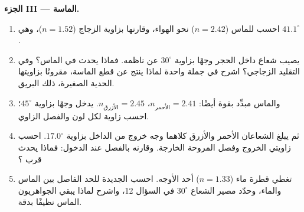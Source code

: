 \begin{problem}
\medskip
\noindent\textbf{الجزء III --- الماسة.}
\begin{enumerate}[resume]
  \item احسب  للماس ($n = 2.42$) نحو الهواء،
        وقارنها بزاوية الزجاج ($n = 1.52$)،
        وهي $41.1^\circ$.
  \item يصيب شعاع داخل الحجر وجهًا بزاوية $30^\circ$ عن
        ناظمه. فماذا يحدث في الماس؟ وفي التقليد الزجاجي؟
        اشرح في جملة واحدة لماذا ينتج عن قطع الماسة، مقرونًا
        بزاويتها الحدية الصغيرة، ذلك البريق.
  \item والماس مبدِّد بقوة أيضًا: $n_{\text{الأحمر}} = 2.41$،
        $n_{\text{الأزرق}} = 2.45$. يدخل  وجهًا بزاوية
        $45^\circ$؛ احسب زاوية  لكل لون والفصل
        الزاوي.
  \item ثم يبلغ الشعاعان الأحمر والأزرق كلاهما وجه خروج من الداخل
        بزاوية $17.0^\circ$. احسب زاويتي الخروج وفصل
        المروحة الخارجة. وقارنه بالفصل عند الدخول: فماذا يحدث
         قرب ؟
  \item تغطي قطرة ماء ($n = 1.33$) أحد الأوجه. احسب  الجديدة للحد الفاصل بين الماس والماء، وحدّد مصير
        الشعاع $30^\circ$ في السؤال 12، واشرح لماذا يبقي الجواهريون
        الماس نظيفًا بدقة.
\end{enumerate}


\end{problem}
